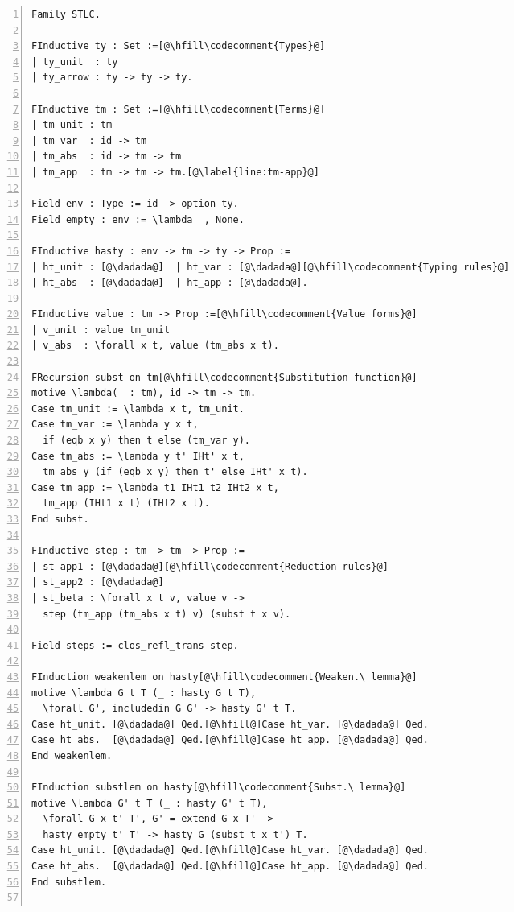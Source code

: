 \begin{figure}
\begin{minipage}{\textwidth}
\begin{multicols}{2}


\begin{lstlisting}[numbers=left]
Family STLC.

FInductive ty : Set :=[@\hfill\codecomment{Types}@]
| ty_unit  : ty
| ty_arrow : ty -> ty -> ty.

FInductive tm : Set :=[@\hfill\codecomment{Terms}@]
| tm_unit : tm
| tm_var  : id -> tm
| tm_abs  : id -> tm -> tm
| tm_app  : tm -> tm -> tm.[@\label{line:tm-app}@]

Field env : Type := id -> option ty.
Field empty : env := \lambda _, None.

FInductive hasty : env -> tm -> ty -> Prop :=
| ht_unit : [@\dadada@]  | ht_var : [@\dadada@][@\hfill\codecomment{Typing rules}@]
| ht_abs  : [@\dadada@]  | ht_app : [@\dadada@].

FInductive value : tm -> Prop :=[@\hfill\codecomment{Value forms}@]
| v_unit : value tm_unit
| v_abs  : \forall x t, value (tm_abs x t).

FRecursion subst on tm[@\hfill\codecomment{Substitution function}@] 
motive \lambda(_ : tm), id -> tm -> tm.
Case tm_unit := \lambda x t, tm_unit.
Case tm_var := \lambda y x t,
  if (eqb x y) then t else (tm_var y).
Case tm_abs := \lambda y t' IHt' x t,
  tm_abs y (if (eqb x y) then t' else IHt' x t).
Case tm_app := \lambda t1 IHt1 t2 IHt2 x t,
  tm_app (IHt1 x t) (IHt2 x t).
End subst.

FInductive step : tm -> tm -> Prop :=
| st_app1 : [@\dadada@][@\hfill\codecomment{Reduction rules}@]
| st_app2 : [@\dadada@]
| st_beta : \forall x t v, value v ->
  step (tm_app (tm_abs x t) v) (subst t x v).

Field steps := clos_refl_trans step.

FInduction weakenlem on hasty[@\hfill\codecomment{Weaken.\ lemma}@]
motive \lambda G t T (_ : hasty G t T),
  \forall G', includedin G G' -> hasty G' t T.
Case ht_unit. [@\dadada@] Qed.[@\hfill@]Case ht_var. [@\dadada@] Qed.
Case ht_abs.  [@\dadada@] Qed.[@\hfill@]Case ht_app. [@\dadada@] Qed.
End weakenlem.

FInduction substlem on hasty[@\hfill\codecomment{Subst.\ lemma}@]
motive \lambda G' t T (_ : hasty G' t T),
  \forall G x t' T', G' = extend G x T' ->
  hasty empty t' T' -> hasty G (subst t x t') T.
Case ht_unit. [@\dadada@] Qed.[@\hfill@]Case ht_var. [@\dadada@] Qed.
Case ht_abs.  [@\dadada@] Qed.[@\hfill@]Case ht_app. [@\dadada@] Qed.
End substlem.


\end{lstlisting}
\end{multicols}
\end{minipage}
\end{figure}
